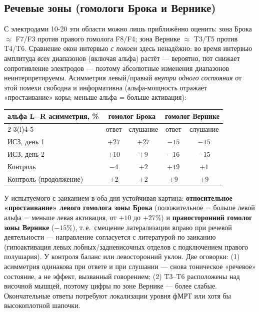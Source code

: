 \documentclass[11pt,a4paper]{article}
\begin{document}
\subsection*{Речевые зоны (гомологи Брока и Вернике)}
С электродами 10-20 эти области можно лишь приближённо оценить: зона Брока $\approx$ F7/F3 против
правого гомолога F8/F4; зона Вернике $\approx$ T3/T5 против T4/T6. Сравнение окон интервью
\emph{с покоем} здесь ненадёжно: во время интервью амплитуда \emph{всех} диапазонов (включая
альфа) растёт --- вероятно, пот снижает сопротивление электродов --- поэтому абсолютные изменения
диапазонов неинтерпретируемы. Асимметрия левый/правый \emph{внутри одного состояния} от этой
помехи свободна и информативна (альфа-мощность отражает «простаивание» коры; меньше альфа =
больше активация):
\begin{center}\small
\begin{tabular}{@{}lcccc@{}}
\toprule
альфа L$-$R асимметрия, \% & \multicolumn{2}{c}{гомолог Брока} & \multicolumn{2}{c}{гомолог Вернике} \\
\cmidrule(r){2-3}\cmidrule(l){4-5}
& ответ & слушание & ответ & слушание \\
\midrule
ИСЗ, день 1 & $+27$ & $+27$ & $-15$ & $-15$ \\
ИСЗ, день 2 & $+10$ & $+9$ & $-16$ & $-15$ \\
Контроль & $-4$ & $+2$ & $+19$ & $+1$ \\
Контроль (продолжение) & $+2$ & $+2$ & $+9$ & $+9$ \\
\bottomrule
\end{tabular}
\end{center}
У испытуемого с заиканием в оба дня устойчивая картина: \textbf{относительное «простаивание» левого
гомолога зоны Брока} (положительное = больше левой альфа = меньше левая активация, от $+10$ до
$+27\%$) и \textbf{правосторонний гомолог зоны Вернике} ($-15\%$), т.\,е.\ смещение латерализации
вправо при речевой деятельности --- направление согласуется с литературой по заиканию
(гипоактивация левых лобных/задневисочных отделов с подключением правого полушария). У контроля
баланс или левосторонний уклон. Две оговорки: (1) асимметрия одинакова при ответе и при слушании
--- снова тоническое «речевое» состояние, а не эффект, вызванный говорением; (2) T3--T6 расположены
над височной мышцей, поэтому цифры по зоне Вернике --- более слабые. Окончательные ответы
потребуют локализации уровня фМРТ или хотя бы высокоплотной шапочки.
\end{document}
